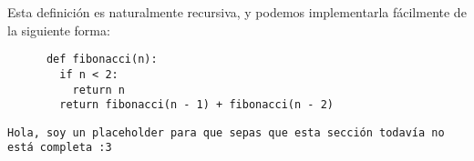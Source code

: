     Esta definición es naturalmente recursiva, y podemos implementarla fácilmente de la siguiente 
    forma:

    \begin{verbatim}
      def fibonacci(n):
        if n < 2:
          return n
        return fibonacci(n - 1) + fibonacci(n - 2)
    \end{verbatim}

  \begin{center}
    \texttt{Hola, soy un placeholder para que sepas que esta sección todavía no está completa :3}
  \end{center}